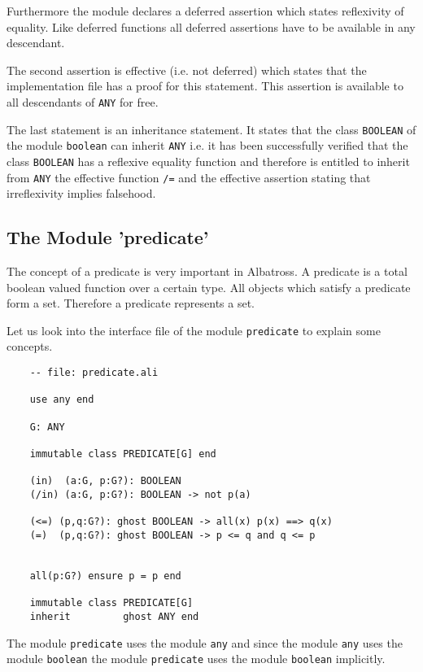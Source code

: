 Furthermore the module declares a deferred assertion which states reflexivity
of equality. Like deferred functions all deferred assertions have to be
available in any descendant.

The second assertion is effective (i.e. not deferred) which states that the
implementation file has a proof for this statement. This assertion is
available to all descendants of \lstinline!ANY! for free.

The last statement is an inheritance statement. It states that the class
\lstinline!BOOLEAN! of the module \lstinline!boolean! can inherit
\lstinline!ANY! i.e. it has been successfully verified that the class
\lstinline!BOOLEAN! has a reflexive equality function and therefore is
entitled to inherit from \lstinline!ANY! the effective function \lstinline!/=!
and the effective assertion stating that irreflexivity implies falsehood.


\subsection{The Module 'predicate'}
\label{module-predicate}

The concept of a predicate is very important in Albatross. A predicate is a
total boolean valued function over a certain type. All objects which satisfy a
predicate form a set. Therefore a predicate represents a set.

Let us look into the interface file of the module \lstinline!predicate! to
explain some concepts.

\begin{lstlisting}
    -- file: predicate.ali

    use any end

    G: ANY

    immutable class PREDICATE[G] end

    (in)  (a:G, p:G?): BOOLEAN
    (/in) (a:G, p:G?): BOOLEAN -> not p(a)

    (<=) (p,q:G?): ghost BOOLEAN -> all(x) p(x) ==> q(x)
    (=)  (p,q:G?): ghost BOOLEAN -> p <= q and q <= p


    all(p:G?) ensure p = p end

    immutable class PREDICATE[G]
    inherit         ghost ANY end
\end{lstlisting}

The module \lstinline!predicate! uses the module \lstinline!any! and since the
module \lstinline!any! uses the module \lstinline!boolean! the module
\lstinline!predicate! uses the module \lstinline!boolean! implicitly.

